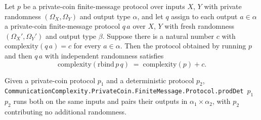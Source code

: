 \begin{theorem}
\label{CommunicationComplexity.PrivateCoin.FiniteMessage.Protocol.rbind_complexity_const}
\leanok
{}
Let $p$ be a private-coin finite-message protocol over inputs $X$, $Y$ with private
randomness $(\Omega_X, \Omega_Y)$ and output type $\alpha$, and let $q$ assign to each
output $a \in \alpha$ a private-coin finite-message protocol $q\,a$ over $X$, $Y$ with
fresh randomness $(\Omega_X', \Omega_Y')$ and output type $\beta$. Suppose there is a
natural number $c$ with $\mathrm{complexity}(q\,a) = c$ for every $a \in \alpha$. Then
the protocol obtained by running $p$ and then $q\,a$ with independent randomness
satisfies
\[
  \mathrm{complexity}(\mathrm{rbind}\,p\,q) \;=\; \mathrm{complexity}(p) + c.
\]
\end{theorem}

\begin{definition}
\label{CommunicationComplexity.PrivateCoin.FiniteMessage.Protocol.prodDet}
\leanok
{}
Given a private-coin protocol $p_1$ and a deterministic protocol $p_2$,
\texttt{CommunicationComplexity.PrivateCoin.FiniteMessage.Protocol.prodDet}~$p_1$~$p_2$ runs both on the same inputs and pairs their outputs
in $\alpha_1 \times \alpha_2$, with $p_2$ contributing no additional randomness.
\end{definition}

